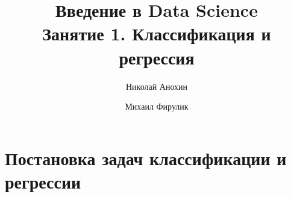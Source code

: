 \documentclass[10pt,a4paper]{beamer}
\author{Николай Анохин \and Михаил Фирулик}
\title{Введение в Data Science \\ Занятие 1. Классификация и регрессия}
\begin{document}
\maketitle


\begin{frame}

\tableofcontents

\end{frame}


\section{Постановка задач классификации и регрессии}

\end{document}
